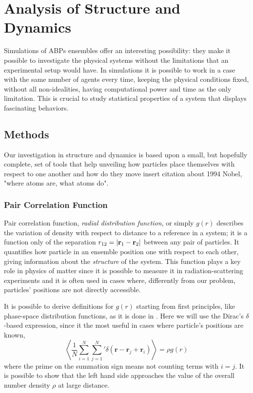 \documentclass[../../master_thesis_np.tex]{subfiles}
\begin{document}
	\chapter{Analysis of Structure and Dynamics}
	Simulations of ABPs ensembles offer an interesting possibility: they make it possible to investigate the physical systems without the limitations that an experimental setup would have. In simulations it is possible to work in a case with the same number of agents every time, keeping the physical conditions fixed, without all non-idealities, having computational power and time as the only limitation. This is crucial to study statistical properties of a system that displays fascinating behaviors.
	
	\section{Methods}
	Our investigation in structure and dynamics is based upon a small, but hopefully complete, set of tools that help unveiling how particles place themselves with respect to one another and how do they move {\color{blue} insert citation about 1994 Nobel, "where atoms are, what atoms do"}.
	
		\subsection{Pair Correlation Function}
		Pair correlation function, \emph{radial distribution function}, or simply $g(r)$ describes the variation of density with respect to distance to a reference in a system; it is a function only of the separation $r_{12} = \abs{\vb{r}_1 - \vb{r}_2}$ between any pair of particles. It quantifies how particle in an ensemble position one with respect to each other, giving information about the \emph{structure} of the system. This function plays a key role in physics of matter since it is possible to measure it in radiation-scattering experiments and it is often used in cases where, differently from our problem, particles' positions are not directly accessible.
		
		It is possible to derive definitions for $g(r)$ starting from first principles, like phase-space distribution functions, as it is done in \cite{hansen90a}. Here we will use the Dirac's $\delta$-based expression, since it the most useful in cases where particle's positions are known,
		\begin{equation}
			\left\langle \frac{1}{N} \sum_{i=1}^{N} \sum_{j=1}^{N}{}' \delta (\mathbf{r} - \mathbf{r}_j + \mathbf{r}_i) \right\rangle = \rho g(r)
		\end{equation}
		where the prime on the summation sign means not counting terms with $i = j$. It is possible to show that the left hand side approaches the value of the overall number density $\rho$ at large distance.
		
\end{document}
